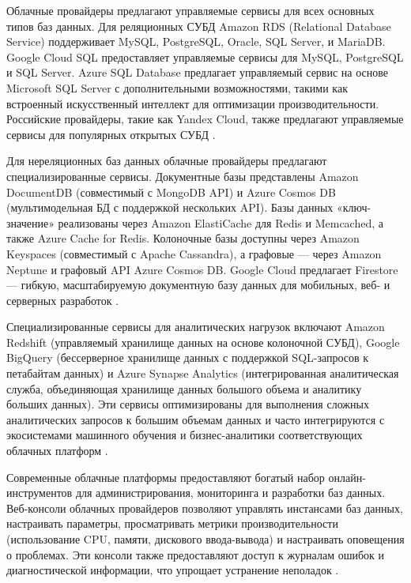 \documentclass{SibFU-docs}
\begin{document}

Облачные провайдеры предлагают управляемые сервисы для всех основных типов баз данных. Для реляционных СУБД Amazon RDS (Relational Database Service) поддерживает MySQL, PostgreSQL, Oracle, SQL Server, и MariaDB. Google Cloud SQL предоставляет управляемые сервисы для MySQL, PostgreSQL и SQL Server. Azure SQL Database предлагает управляемый сервис на основе Microsoft SQL Server с дополнительными возможностями, такими как встроенный искусственный интеллект для оптимизации производительности. Российские провайдеры, такие как Yandex Cloud, также предлагают управляемые сервисы для популярных открытых СУБД \cite{clickhousedocs}.

Для нереляционных баз данных облачные провайдеры предлагают специализированные сервисы. Документные базы представлены Amazon DocumentDB (совместимый с MongoDB API) и Azure Cosmos DB (мультимодельная БД с поддержкой нескольких API). Базы данных «ключ-значение» реализованы через Amazon ElastiCache для Redis и Memcached, а также Azure Cache for Redis. Колоночные базы доступны через Amazon Keyspaces (совместимый с Apache Cassandra), а графовые — через Amazon Neptune и графовый API Azure Cosmos DB. Google Cloud предлагает Firestore — гибкую, масштабируемую документную базу данных для мобильных, веб- и серверных разработок \cite{kafka}.

Специализированные сервисы для аналитических нагрузок включают Amazon Redshift (управляемый хранилище данных на основе колоночной СУБД), Google BigQuery (бессерверное хранилище данных с поддержкой SQL-запросов к петабайтам данных) и Azure Synapse Analytics (интегрированная аналитическая служба, объединяющая хранилище данных большого объема и аналитику больших данных). Эти сервисы оптимизированы для выполнения сложных аналитических запросов к большим объемам данных и часто интегрируются с экосистемами машинного обучения и бизнес-аналитики соответствующих облачных платформ \cite{clickhousedocs}.


Современные облачные платформы предоставляют богатый набор онлайн-инструментов для администрирования, мониторинга и разработки баз данных. Веб-консоли облачных провайдеров позволяют управлять инстансами баз данных, настраивать параметры, просматривать метрики производительности (использование CPU, памяти, дискового ввода-вывода) и настраивать оповещения о проблемах. Эти консоли также предоставляют доступ к журналам ошибок и диагностической информации, что упрощает устранение неполадок \cite{prometheus}.
\end{document}
